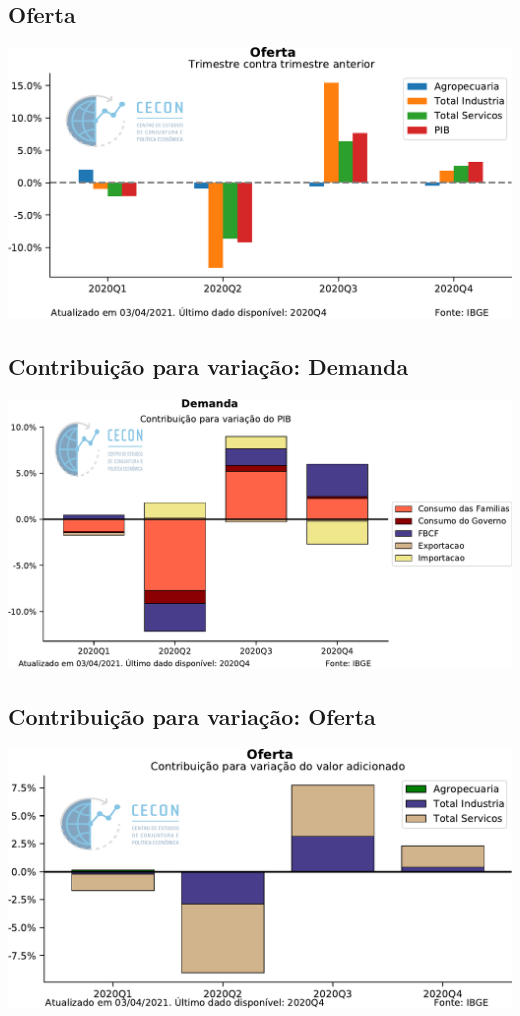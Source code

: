 \documentclass{SelfArx}
\begin{document}
\subsection*{Oferta}
\label{sec:org398a66c}


\begin{center}
\includegraphics[width=.9\linewidth]{./figs/PIB/Oferta.pdf}
\end{center}


\subsection*{Contribuição para variação: Demanda}
\label{sec:orge68239d}

\begin{center}
\includegraphics[width=.9\linewidth]{./figs/PIB/Contrib_Demanda.pdf}
\end{center}

\subsection*{Contribuição para variação: Oferta}
\label{sec:org0e5766f}

\begin{center}
\includegraphics[width=.9\linewidth]{./figs/PIB/Contrib_Oferta.pdf}
\end{center}
\end{document}
